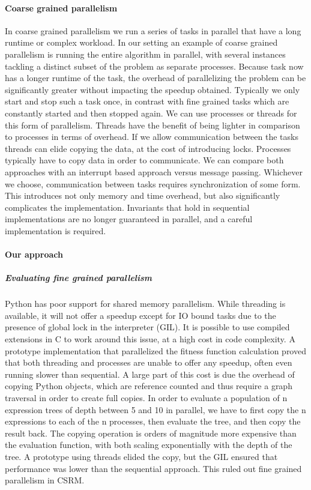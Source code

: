 \paragraph{Coarse grained parallelism}
In coarse grained parallelism we run a series of tasks in parallel that have a long runtime or complex workload. In our setting an example of coarse grained parallelism is running the entire algorithm in parallel, with several instances tackling a distinct subset of the problem as separate processes. Because task now has a longer runtime of the task, the overhead of parallelizing the problem can be significantly greater without impacting the speedup obtained. Typically we only start and stop such a task once, in contrast with fine grained tasks which are constantly started and then stopped again. We can use processes or threads for this form of parallelism. Threads have the benefit of being lighter in comparison to processes in terms of overhead. If we allow communication between the tasks threads can elide copying the data, at the cost of introducing locks. Processes typically have to copy data in order to communicate. We can compare both approaches with an interrupt based approach versus message passing. Whichever we choose, communication between tasks requires synchronization of some form. This introduces not only memory and time overhead, but also significantly complicates the implementation. Invariants that hold in sequential implementations are no longer guaranteed in parallel, and a careful implementation is required. 

\paragraph{Our approach}

\subparagraph{Evaluating fine grained parallelism}
Python has poor support for shared memory parallelism. While threading is available, it will not offer a speedup except for IO bound tasks due to the presence of global lock in the interpreter (GIL). It is possible to use compiled extensions in C to work around this issue, at a high cost in code complexity. A prototype implementation that parallelized the fitness function calculation proved that both threading and processes are unable to offer any speedup, often even running slower than sequential. A large part of this cost is due the overhead of copying Python objects, which are reference counted and thus require a graph traversal in order to create full copies. In order to evaluate a population of n expression trees of depth between 5 and 10 in parallel, we have to first copy the n expressions to each of the n processes, then evaluate the tree, and then copy the result back. The copying operation is orders of magnitude more expensive than the evaluation function, with both scaling exponentially with the depth of the tree. A prototype using threads elided the copy, but the GIL ensured that performance was lower than the sequential approach.
This ruled out fine grained parallelism in CSRM.

